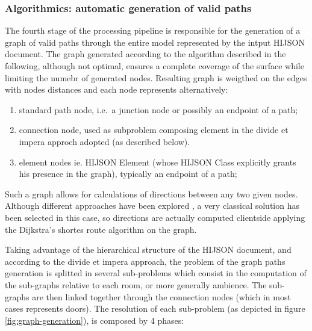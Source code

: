 \subsubsection{Algorithmics: automatic generation of valid paths}\label{algorithmics-automatic-generation-of-valid-paths}

The fourth stage of the processing pipeline is responsible for the
generation of a graph of valid paths through the entire model
represented by the intput HIJSON document. The graph generated according
to the algorithm described in the following, although not optimal,
ensures a complete coverage of the surface while limiting the numebr of
generated nodes. Resulting graph is weigthed on the edges with nodes
distances and each node represents alternatively:

\begin{enumerate}
\def\labelenumi{\alph{enumi}.}
\itemsep1pt\parskip0pt
\item
 standard path node, i.e.~a junction node or possibly an endpoint of a
 path;
\item
 connection node, used as subproblem composing element in the divide et
 impera approch adopted (as described below).
\item
 element nodes ie. HIJSON Element (whose HIJSON Class explicitly grants
 his presence in the graph), typically an endpoint of a path;
\end{enumerate}

Such a graph allows for calculations of directions between any two given
nodes. Although different approaches have been explored \cite{6999103}, 
a very classical solution has been selected in this case, so directions 
are actually computed clientside applying the Dijkstra's shortes route 
algorithm on the graph. 

Taking advantage of the hierarchical structure of the HIJSON document,
and according to the divide et impera approach, the problem of the graph
paths generation is splitted in several sub-problems which consist in
the computation of the sub-graphs relative to each room, or more
generally ambience. The sub-graphs are then linked together through the
connection nodes (which in most cases represents doors). The resolution
of each sub-problem (as depicted in figure \ref{fig:graph-generation}), 
is composed by 4 phases:


